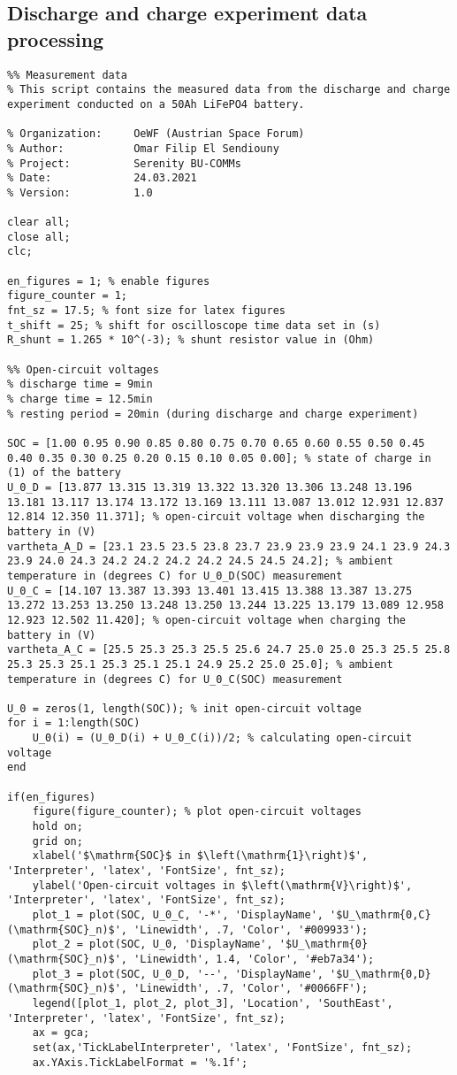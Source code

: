 \subsection{Discharge and charge experiment data processing}
\begin{lstlisting}
%% Measurement data
% This script contains the measured data from the discharge and charge experiment conducted on a 50Ah LiFePO4 battery.

% Organization:     OeWF (Austrian Space Forum)
% Author:           Omar Filip El Sendiouny
% Project:          Serenity BU-COMMs
% Date:             24.03.2021
% Version:          1.0

clear all;
close all;
clc;

en_figures = 1; % enable figures
figure_counter = 1;
fnt_sz = 17.5; % font size for latex figures
t_shift = 25; % shift for oscilloscope time data set in (s)
R_shunt = 1.265 * 10^(-3); % shunt resistor value in (Ohm)

%% Open-circuit voltages
% discharge time = 9min
% charge time = 12.5min
% resting period = 20min (during discharge and charge experiment)

SOC = [1.00 0.95 0.90 0.85 0.80 0.75 0.70 0.65 0.60 0.55 0.50 0.45 0.40 0.35 0.30 0.25 0.20 0.15 0.10 0.05 0.00]; % state of charge in (1) of the battery
U_0_D = [13.877 13.315 13.319 13.322 13.320 13.306 13.248 13.196 13.181 13.117 13.174 13.172 13.169 13.111 13.087 13.012 12.931 12.837 12.814 12.350 11.371]; % open-circuit voltage when discharging the battery in (V) 
vartheta_A_D = [23.1 23.5 23.5 23.8 23.7 23.9 23.9 23.9 24.1 23.9 24.3 23.9 24.0 24.3 24.2 24.2 24.2 24.2 24.5 24.5 24.2]; % ambient temperature in (degrees C) for U_0_D(SOC) measurement
U_0_C = [14.107 13.387 13.393 13.401 13.415 13.388 13.387 13.275 13.272 13.253 13.250 13.248 13.250 13.244 13.225 13.179 13.089 12.958 12.923 12.502 11.420]; % open-circuit voltage when charging the battery in (V)
vartheta_A_C = [25.5 25.3 25.3 25.5 25.6 24.7 25.0 25.0 25.3 25.5 25.8 25.3 25.3 25.1 25.3 25.1 25.1 24.9 25.2 25.0 25.0]; % ambient temperature in (degrees C) for U_0_C(SOC) measurement

U_0 = zeros(1, length(SOC)); % init open-circuit voltage
for i = 1:length(SOC)
    U_0(i) = (U_0_D(i) + U_0_C(i))/2; % calculating open-circuit voltage
end

if(en_figures)
    figure(figure_counter); % plot open-circuit voltages
    hold on;
    grid on;
    xlabel('$\mathrm{SOC}$ in $\left(\mathrm{1}\right)$', 'Interpreter', 'latex', 'FontSize', fnt_sz);
    ylabel('Open-circuit voltages in $\left(\mathrm{V}\right)$', 'Interpreter', 'latex', 'FontSize', fnt_sz);
    plot_1 = plot(SOC, U_0_C, '-*', 'DisplayName', '$U_\mathrm{0,C}(\mathrm{SOC}_n)$', 'Linewidth', .7, 'Color', '#009933');
    plot_2 = plot(SOC, U_0, 'DisplayName', '$U_\mathrm{0}(\mathrm{SOC}_n)$', 'Linewidth', 1.4, 'Color', '#eb7a34');
    plot_3 = plot(SOC, U_0_D, '--', 'DisplayName', '$U_\mathrm{0,D}(\mathrm{SOC}_n)$', 'Linewidth', .7, 'Color', '#0066FF');
    legend([plot_1, plot_2, plot_3], 'Location', 'SouthEast', 'Interpreter', 'latex', 'FontSize', fnt_sz);
    ax = gca;
    set(ax,'TickLabelInterpreter', 'latex', 'FontSize', fnt_sz);
    ax.YAxis.TickLabelFormat = '%.1f';
    

\end{lstlisting}
